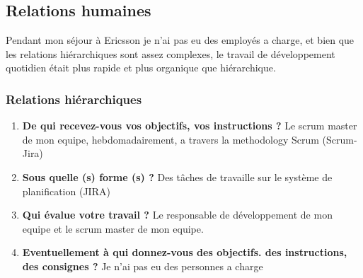 \documentclass{resume} %
\begin{document}
\subsection{Relations humaines}
	
	
	Pendant mon séjour à Ericsson je n'ai pas eu des employés a charge, et bien que les relations hiérarchiques sont assez complexes, le travail de développement quotidien était plus rapide et plus organique que hiérarchique.

	\subsubsection {Relations hiérarchiques}
		\begin{enumerate}
		\item \textbf{De qui recevez-vous vos objectifs, vos instructions ?}
			Le scrum master de mon equipe, hebdomadairement, a travers la methodology Scrum (Scrum-Jira)
		\item \textbf{Sous quelle (s) forme (s) ?}
			Des tâches de travaille sur le système de planification (JIRA) 
		\item \textbf{Qui évalue votre travail ?}
			Le responsable de développement de mon equipe et le scrum master de mon equipe.
		\item  \textbf{Eventuellement à qui donnez-vous des objectifs. des instructions, des consignes ?}
			Je n'ai pas eu des personnes a charge 
		\end{enumerate}
\end{document}
